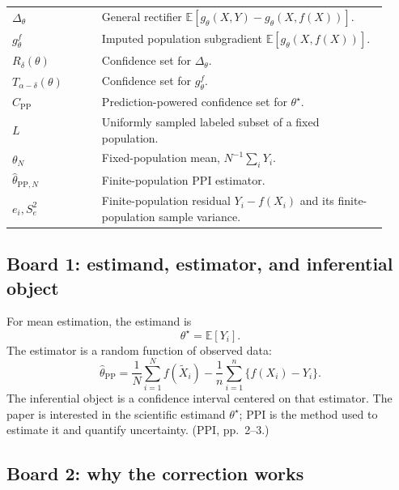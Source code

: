 \documentclass[11pt]{article}
\newcommand{\E}{\mathbb{E}}
\begin{document}
\begin{longtable}{>{\raggedright\arraybackslash}p{0.22\linewidth}
                    >{\raggedright\arraybackslash}p{0.70\linewidth}}
  \(\Delta_\theta\) & General rectifier
  \(\E[g_\theta(X,Y)-g_\theta(X,f(X))]\). \\
  \(g_\theta^f\) & Imputed population subgradient
  \(\E[g_\theta(X,f(X))]\). \\
  \(R_\delta(\theta)\) & Confidence set for \(\Delta_\theta\). \\
  \(T_{\alpha-\delta}(\theta)\) & Confidence set for \(g_\theta^f\). \\
  \(C_{\mathrm{PP}}\) & Prediction-powered confidence set for
  \(\theta^\star\). \\
  \(L\) & Uniformly sampled labeled subset of a fixed population. \\
  \(\theta_N\) & Fixed-population mean, \(N^{-1}\sum_iY_i\). \\
  \(\widehat\theta_{\mathrm{PP},N}\) & Finite-population PPI estimator. \\
  \(e_i,S_e^2\) & Finite-population residual \(Y_i-f(X_i)\) and its finite-
  population sample variance. \\
  \bottomrule
  \end{longtable}
  
  \subsection*{Board 1: estimand, estimator, and inferential object}
  
  For mean estimation, the estimand is
  \[
      \theta^\star=\E[Y_i].
  \]
  The estimator is a random function of observed data:
  \[
      \widehat\theta_{\mathrm{PP}}
      =
      \frac{1}{N}\sum_{i=1}^N f(\widetilde X_i)
      -
      \frac{1}{n}\sum_{i=1}^n\{f(X_i)-Y_i\}.
  \]
  The inferential object is a confidence interval centered on that estimator.
  The paper is interested in the scientific estimand \(\theta^\star\); PPI is the
  method used to estimate it and quantify uncertainty. (PPI, pp.~2--3.)
  
  \subsection*{Board 2: why the correction works}
  
\end{document}
